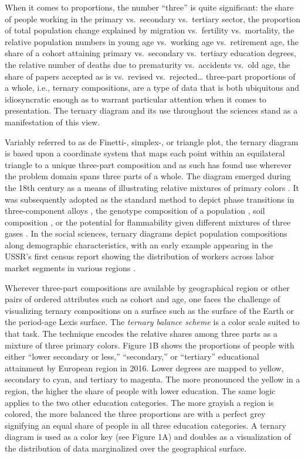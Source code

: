 \documentclass[10pt, twoside, parskip=half]{article}
\begin{document}
When it comes to proportions, the number ``three'' is quite significant:
the share of people working in the primary vs.~secondary vs.~tertiary
sector, the proportion of total population change explained by migration
vs.~fertility vs.~mortality, the relative population numbers in young
age vs.~working age vs.~retirement age, the share of a cohort attaining
primary vs.~secondary vs.~tertiary education degrees, the relative
number of deaths due to prematurity vs.~accidents vs.~old age, the share
of papers accepted as is vs.~revised vs.~rejected\ldots{} three-part
proportions of a whole, i.e., ternary compositions, are a type of data
that is both ubiquitous and idiosyncratic enough as to warrant
particular attention when it comes to presentation. The ternary diagram
and its use throughout the sciences stand as a manifestation of this
view.

Variably referred to as de Finetti-, simplex-, or triangle plot, the
ternary diagram is based upon a coordinate system that maps each point
within an equilateral triangle to a unique three-part composition and as
such has found use wherever the problem domain spans three parts of a
whole. The diagram emerged during the 18th century as a means of
illustrating relative mixtures of primary colors \citep{Howarth1996}. It
was subsequently adopted as the standard method to depict phase
transitions in three-component alloys \citep{Bancroft1897}, the genotype
composition of a population \citep{DeFinetti1926}, soil composition
\citep{Davis1927}, or the potential for flammability given different
mixtures of three gases \citep{Zabetakis1965}. In the social sciences,
ternary diagrams depict population compositions along demographic
characteristics, with an early example appearing in the USSR's first
census report showing the distribution of workers across labor market
segments in various regions \citep{Kvitkin1932}.

Wherever three-part compositions are available by geographical region or
other pairs of ordered attributes such as cohort and age, one faces the
challenge of visualizing ternary compositions on a surface such as the
surface of the Earth or the period-age Lexis surface. The \emph{ternary
balance scheme} \citep{Brewer1994} is a color scale suited to that task.
The technique encodes the relative shares among three parts as a mixture
of three primary colors. Figure 1B shows the proportions of people with
either ``lower secondary or less,'' ``secondary,'' or ``tertiary''
educational attainment by European region in 2016. Lower degrees are
mapped to yellow, secondary to cyan, and tertiary to magenta. The more
pronounced the yellow in a region, the higher the share of people with
lower education. The same logic applies to the two other education
categories. The more grayish a region is colored, the more balanced the
three proportions are with a perfect grey signifying an equal share of
people in all three education categories. A ternary diagram is used as a
color key (see Figure 1A) and doubles as a visualization of the
distribution of data marginalized over the geographical surface.
\end{document}
